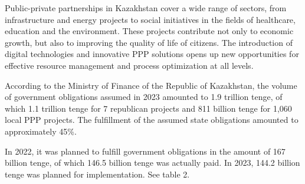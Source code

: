 \begin{multicols}{2}
Public-private partnerships in Kazakhstan cover a wide range of sectors,
from infrastructure and energy projects to social initiatives in the
fields of healthcare, education and the environment. These projects
contribute not only to economic growth, but also to improving the
quality of life of citizens. The introduction of digital technologies
and innovative PPP solutions opens up new opportunities for effective
resource management and process optimization at all levels.

According to the Ministry of Finance of the Republic of Kazakhstan, the
volume of government obligations assumed in 2023 amounted to 1.9
trillion tenge, of which 1.1 trillion tenge for 7 republican projects
and 811 billion tenge for 1,060 local PPP projects. The fulfillment of
the assumed state obligations amounted to approximately 45\%.

In 2022, it was planned to fulfill government obligations in the amount
of 167 billion tenge, of which 146.5 billion tenge was actually paid. In
2023, 144.2 billion tenge was planned for implementation. See table 2.
\end{multicols}


